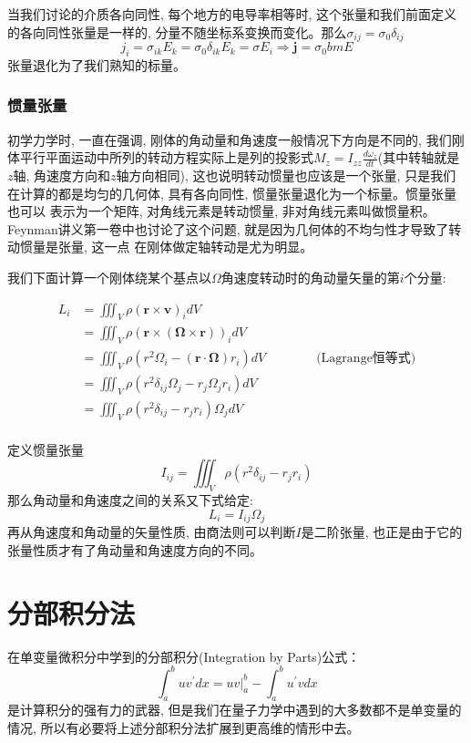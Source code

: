 当我们讨论的介质各向同性, 每个地方的电导率相等时, 这个张量和我们前面定义的各向同性张量是一样的, 分量不随坐标系变换而变化。那么$\sigma_{ij}=\sigma_0\delta_{ij}$
$$j_i=\sigma_{ik}E_k=\sigma_0\delta_{ik}E_k=\sigma E_i\Rightarrow\bm{j}=\sigma_0bm{E}$$张量退化为了我们熟知的标量。
\subsubsection*{惯量张量}
初学力学时, 一直在强调, 刚体的角动量和角速度一般情况下方向是不同的, 我们刚体平行平面运动中所列的转动方程实际上是列的投影式$M_z=I_{zz}\frac{d\omega_z}{dt}$(其中转轴就是
$z$轴, 角速度方向和$z$轴方向相同), 这也说明转动惯量也应该是一个张量, 只是我们在计算的都是均匀的几何体, 具有各向同性, 惯量张量退化为一个标量。惯量张量也可以
表示为一个矩阵, 对角线元素是转动惯量, 非对角线元素叫做惯量积。Feynman讲义第一卷中也讨论了这个问题, 就是因为几何体的不均匀性才导致了转动惯量是张量, 这一点
在刚体做定轴转动是尤为明显。

我们下面计算一个刚体绕某个基点以$\Omega$角速度转动时的角动量矢量的第$i$个分量:
\begin{center}
    \begin{equation*}
        \displaystyle
        \begin{split}
            L_i&=\iiint_V \rho(\bm{r}\times\bm{v})_idV\\
               &=\iiint_V \rho(\bm{r}\times\left(\bm{\Omega}\times\bm{r}\right))_idV\\
               &=\iiint_V \rho\left(r^2\Omega_i-\left(\bm{r}\cdot\bm{\Omega}\right)r_i\right)dV \qquad\qquad\text{(Lagrange恒等式)}\\
               &=\iiint_V \rho\left(r^2\delta_{ij}\Omega_j-r_j\Omega_jr_i\right)dV\\
               &=\iiint_V \rho\left(r^2\delta_{ij}-r_jr_i\right)\Omega_jdV\\
        \end{split}
    \end{equation*}
\end{center}    
定义惯量张量$$I_{ij}=\iiint_V \rho\left(r^2\delta_{ij}-r_jr_i\right)$$
那么角动量和角速度之间的关系又下式给定:
$$L_i=I_{ij}\Omega_j$$
再从角速度和角动量的矢量性质, 由商法则可以判断$I$是二阶张量, 也正是由于它的张量性质才有了角动量和角速度方向的不同。

\section{分部积分法}
在单变量微积分中学到的分部积分(Integration by Parts)公式：
\begin{equation}
    \int_a^buv^\prime dx=\left. {{uv}} \right|_a^b-\int_a^bu^\prime v dx
\end{equation}
是计算积分的强有力的武器, 但是我们在量子力学中遇到的大多数都不是单变量的情况, 所以有必要将上述分部积分法扩展到更高维的情形中去。

